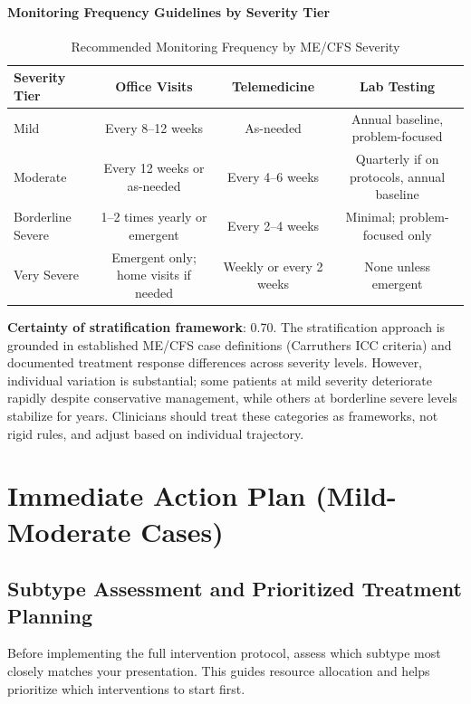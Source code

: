 \paragraph{Monitoring Frequency Guidelines by Severity Tier}

\begin{table}[h]
\centering
\small
\begin{tabular}{|l|c|c|c|}
\hline
\textbf{Severity Tier} & \textbf{Office Visits} & \textbf{Telemedicine} & \textbf{Lab Testing} \\
\hline
Mild & Every 8--12 weeks & As-needed & Annual baseline, problem-focused \\
\hline
Moderate & Every 12 weeks or as-needed & Every 4--6 weeks & Quarterly if on protocols, annual baseline \\
\hline
Borderline Severe & 1--2 times yearly or emergent & Every 2--4 weeks & Minimal; problem-focused only \\
\hline
Very Severe & Emergent only; home visits if needed & Weekly or every 2 weeks & None unless emergent \\
\hline
\end{tabular}
\caption{Recommended Monitoring Frequency by ME/CFS Severity}
\label{tab:monitoring-frequency}
\end{table}

\textbf{Certainty of stratification framework}: 0.70. The stratification approach is grounded in established ME/CFS case definitions (Carruthers ICC criteria) and documented treatment response differences across severity levels. However, individual variation is substantial; some patients at mild severity deteriorate rapidly despite conservative management, while others at borderline severe levels stabilize for years. Clinicians should treat these categories as frameworks, not rigid rules, and adjust based on individual trajectory.

\section{Immediate Action Plan (Mild-Moderate Cases)}
\label{sec:immediate-mild-moderate}

\subsection{Subtype Assessment and Prioritized Treatment Planning}
\label{sec:subtype-mild-moderate}

Before implementing the full intervention protocol, assess which subtype most closely matches your presentation. This guides resource allocation and helps prioritize which interventions to start first.

